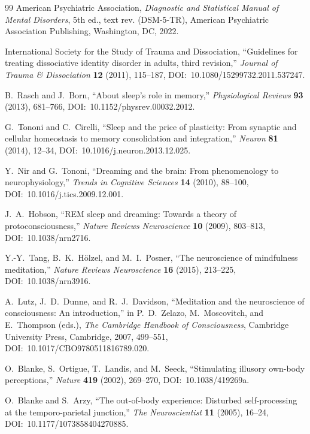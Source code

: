 \documentclass[12pt]{article}
\theoremstyle{definition}
\theoremstyle{remark}
\begin{document}
\begin{thebibliography}{99}
American Psychiatric Association,
\emph{Diagnostic and Statistical Manual of Mental Disorders},
5th ed., text rev. (DSM-5-TR),
American Psychiatric Association Publishing, Washington, DC, 2022.

International Society for the Study of Trauma and Dissociation,
``Guidelines for treating dissociative identity disorder in adults,
third revision,''
\emph{Journal of Trauma \& Dissociation} \textbf{12} (2011), 115--187,
DOI:~10.1080/15299732.2011.537247.

B.~Rasch and J.~Born,
``About sleep's role in memory,''
\emph{Physiological Reviews} \textbf{93} (2013), 681--766,
DOI:~10.1152/physrev.00032.2012.

G.~Tononi and C.~Cirelli,
``Sleep and the price of plasticity: From synaptic and cellular
homeostasis to memory consolidation and integration,''
\emph{Neuron} \textbf{81} (2014), 12--34,
DOI:~10.1016/j.neuron.2013.12.025.

Y.~Nir and G.~Tononi,
``Dreaming and the brain: From phenomenology to neurophysiology,''
\emph{Trends in Cognitive Sciences} \textbf{14} (2010), 88--100,
DOI:~10.1016/j.tics.2009.12.001.

J.~A.~Hobson,
``REM sleep and dreaming: Towards a theory of protoconsciousness,''
\emph{Nature Reviews Neuroscience} \textbf{10} (2009), 803--813,
DOI:~10.1038/nrn2716.

Y.-Y.~Tang, B.~K.~H{\"o}lzel, and M.~I.~Posner,
``The neuroscience of mindfulness meditation,''
\emph{Nature Reviews Neuroscience} \textbf{16} (2015), 213--225,
DOI:~10.1038/nrn3916.

A.~Lutz, J.~D.~Dunne, and R.~J.~Davidson,
``Meditation and the neuroscience of consciousness: An introduction,''
in P.~D.~Zelazo, M.~Moscovitch, and E.~Thompson (eds.),
\emph{The Cambridge Handbook of Consciousness},
Cambridge University Press, Cambridge, 2007, 499--551,
DOI:~10.1017/CBO9780511816789.020.

O.~Blanke, S.~Ortigue, T.~Landis, and M.~Seeck,
``Stimulating illusory own-body perceptions,''
\emph{Nature} \textbf{419} (2002), 269--270,
DOI:~10.1038/419269a.

O.~Blanke and S.~Arzy,
``The out-of-body experience: Disturbed self-processing at the
temporo-parietal junction,''
\emph{The Neuroscientist} \textbf{11} (2005), 16--24,
DOI:~10.1177/1073858404270885.


\end{thebibliography}
\end{document}

